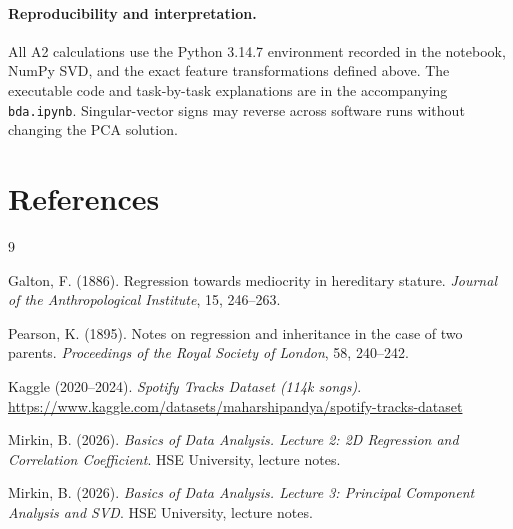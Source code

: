 \documentclass[11pt,a4paper]{article}
\begin{document}
\paragraph{Reproducibility and interpretation.}
All A2 calculations use the Python 3.14.7 environment recorded in the
notebook, NumPy SVD, and the exact feature transformations defined above.
The executable code and task-by-task explanations are in the accompanying
\texttt{bda.ipynb}. Singular-vector signs may reverse across software runs
without changing the PCA solution.

\section*{References}

\begin{thebibliography}{9}

Galton, F. (1886).
\newblock Regression towards mediocrity in hereditary stature.
\newblock \textit{Journal of the Anthropological Institute}, 15, 246--263.

Pearson, K. (1895).
\newblock Notes on regression and inheritance in the case of two parents.
\newblock \textit{Proceedings of the Royal Society of London}, 58, 240--242.

Kaggle (2020--2024).
\newblock \textit{Spotify Tracks Dataset (114k songs)}.
\newblock \url{https://www.kaggle.com/datasets/maharshipandya/spotify-tracks-dataset}

Mirkin, B. (2026).
\newblock \textit{Basics of Data Analysis. Lecture 2: 2D Regression and
  Correlation Coefficient}.
\newblock HSE University, lecture notes.

Mirkin, B. (2026).
\newblock \textit{Basics of Data Analysis. Lecture 3: Principal Component
Analysis and SVD}.
\newblock HSE University, lecture notes.

\end{thebibliography}
\end{document}
